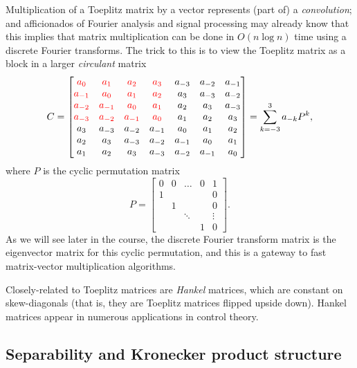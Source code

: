 \documentclass[12pt, leqno]{article} %
\begin{document}
Multiplication of a Toeplitz matrix by a vector represents (part of) a
{\em convolution}; and afficionados of Fourier analysis and signal processing
may already know that this implies that matrix multiplication can be done
in $O(n \log n)$ time using a discrete Fourier transforms.  The trick to
this is to view the Toeplitz matrix as a block in a larger {\em circulant}
matrix
\[
C =
\begin{bmatrix}
  \color{red}{a_0   } & \color{red}{a_1   } & \color{red}{a_2   } & \color{red}{a_3} & a_{-3} & a_{-2} & a_{-1}\\
  \color{red}{a_{-1}} & \color{red}{a_0   } & \color{red}{a_1   } & \color{red}{a_2} & a_{3} & a_{-3} & a_{-2}\\
  \color{red}{a_{-2}} & \color{red}{a_{-1}} & \color{red}{a_0   } & \color{red}{a_1} & a_{2} & a_{3} & a_{-3} \\
  \color{red}{a_{-3}} & \color{red}{a_{-2}} & \color{red}{a_{-1}} & \color{red}{a_0} & a_{1} & a_{2} & a_{3} \\
  a_3 & a_{-3} & a_{-2} & a_{-1} & a_0 & a_1 & a_2 \\
  a_2 & a_3 & a_{-3} & a_{-2} & a_{-1} & a_0 & a_1 \\
  a_1 & a_2 & a_3 & a_{-3} & a_{-2} & a_{-1} & a_0 \\
\end{bmatrix} =
\sum_{k=-3}^3 a_{-k} P^k,
\]
where $P$ is the cyclic permutation matrix
\[
  P =
  \begin{bmatrix}
  0 & 0 & \dots & 0 & 1 \\
  1 &   &       &   & 0 \\
    & 1 &       &   & 0 \\
    &   & \ddots&   & \vdots \\
    &   &       & 1 & 0
  \end{bmatrix}.
\]
As we will see later in the course, the discrete Fourier transform matrix
is the eigenvector matrix for this cyclic permutation, and this is a
gateway to fast matrix-vector multiplication algorithms.

Closely-related to Toeplitz matrices are {\em Hankel} matrices, which
are constant on skew-diagonals (that is, they are Toeplitz matrices
flipped upside down).  Hankel matrices appear in numerous
applications in control theory.

\subsection{Separability and Kronecker product structure}
\end{document}
